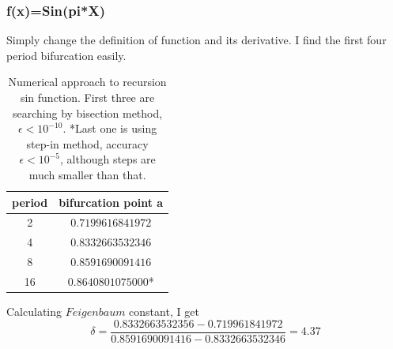 \documentclass[12pt]{article}
\begin{document}
\subsubsection{f(x)=Sin(pi*X)}
Simply change the definition of function and its derivative. I find the first four period bifurcation easily.
\begin{table}[h]
	\begin{center}
		\begin{tabular}{c|c}
			\hline
			period & bifurcation point a\\ 
			\hline
			2 & $0.7199616841972$ \\
			4 & $0.8332663532346$\\
			8 & $0.8591690091416$\\
			16& $0.8640801075000$*\\
			\hline
		\end{tabular}
	\end{center}
	\caption{Numerical approach to recursion sin function. First three are searching by bisection method, $\epsilon<10^{-10}$. *Last one is using step-in method, accuracy$\epsilon<10^{-5}$, although steps are much smaller than that.}
\end{table}
Calculating $Feigenbaum$ constant, I get
\begin{equation}
	\delta=\frac{0.8332663532356-0.719961841972}{0.8591690091416-0.8332663532346}=4.37
\end{equation}
\end{document}
